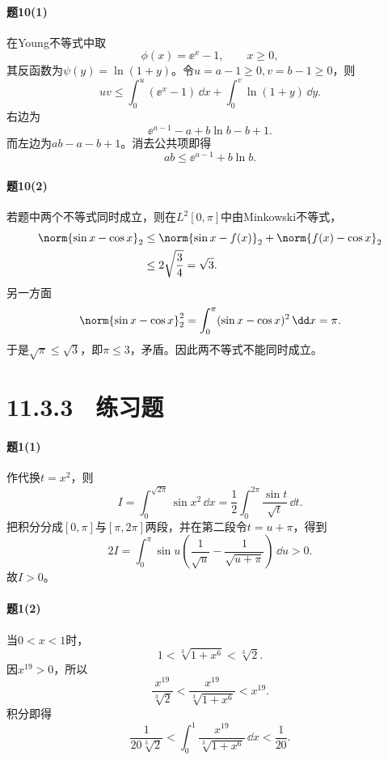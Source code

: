 \paragraph{题10(1)}
\begin{xsolution}
在Young不等式中取
\[
 \phi(x)=\ee^x-1,\qquad x\ge0,
\]
其反函数为$\psi(y)=\ln(1+y)$。令$u=a-1\ge0,v=b-1\ge0$，则
\[
 uv\le\int_0^u(\ee^x-1)\,\dd x+
 \int_0^v\ln(1+y)\,\dd y.
\]
右边为
\[
 \ee^{a-1}-a+b\ln b-b+1.
\]
而左边为$ab-a-b+1$。消去公共项即得
\[
 \boxed{ab\le\ee^{a-1}+b\ln b}.
\]
\end{xsolution}

\paragraph{题10(2)}
\begin{xsolution}
若题中两个不等式同时成立，则在$L^2[0,\pi]$中由Minkowski不等式，
\begin{align*}
\norm{\sin x-\cos x}_2
&\le\norm{\sin x-f(x)}_2+\norm{f(x)-\cos x}_2\\
&\le2\sqrt{\frac34}=\sqrt3.
\end{align*}
另一方面
\[
 \norm{\sin x-\cos x}_2^2
 =\int_0^\pi(\sin x-\cos x)^2\,\dd x=\pi.
\]
于是$\sqrt\pi\le\sqrt3$，即$\pi\le3$，矛盾。因此两不等式不能同时成立。
\end{xsolution}

\section*{11.3.3　练习题}

\paragraph{题1(1)}
\begin{xsolution}
作代换$t=x^2$，则
\[
 I=\int_0^{\sqrt{2\pi}}\sin x^2\,\dd x
 =\frac12\int_0^{2\pi}\frac{\sin t}{\sqrt t}\,\dd t.
\]
把积分分成$[0,\pi]$与$[\pi,2\pi]$两段，并在第二段令$t=u+\pi$，得到
\[
 2I=\int_0^\pi\sin u\left(\frac1{\sqrt u}-\frac1{\sqrt{u+\pi}}\right)\,\dd u>0.
\]
故$I>0$。
\end{xsolution}

\paragraph{题1(2)}
\begin{xsolution}
当$0<x<1$时，
\[
 1<\sqrt[3]{1+x^6}<\sqrt[3]2.
\]
因$x^{19}>0$，所以
\[
 \frac{x^{19}}{\sqrt[3]2}
 <\frac{x^{19}}{\sqrt[3]{1+x^6}}<x^{19}.
\]
积分即得
\[
 \frac1{20\sqrt[3]2}
 <\int_0^1\frac{x^{19}}{\sqrt[3]{1+x^6}}\,\dd x
 <\frac1{20}.
\]
\end{xsolution}

